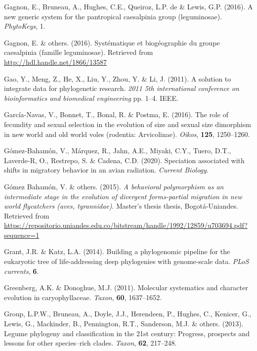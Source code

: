\documentclass[]{article}
\begin{document}
\leavevmode\hypertarget{ref-gagnon2016new}{}%
Gagnon, E., Bruneau, A., Hughes, C.E., Queiroz, L.P. de \& Lewis, G.P. (2016). A new generic system for the pantropical caesalpinia group (leguminosae). \emph{PhytoKeys}, 1.

\leavevmode\hypertarget{ref-gagnon2016systematique}{}%
Gagnon, E. \& others. (2016). Systématique et biogéographie du groupe caesalpinia (famille leguminosae). Retrieved from \url{http://hdl.handle.net/1866/13587}

\leavevmode\hypertarget{ref-gao2011solution}{}%
Gao, Y., Meng, Z., He, X., Liu, Y., Zhou, Y. \& Li, J. (2011). A solution to integrate data for phylogenetic research. \emph{2011 5th international conference on bioinformatics and biomedical engineering} pp. 1--4. IEEE.

\leavevmode\hypertarget{ref-garcia2016role}{}%
García-Navas, V., Bonnet, T., Bonal, R. \& Postma, E. (2016). The role of fecundity and sexual selection in the evolution of size and sexual size dimorphism in new world and old world voles (rodentia: Arvicolinae). \emph{Oikos}, \textbf{125}, 1250--1260.

\leavevmode\hypertarget{ref-gomez2020speciation}{}%
Gómez-Bahamón, V., Márquez, R., Jahn, A.E., Miyaki, C.Y., Tuero, D.T., Laverde-R, O., Restrepo, S. \& Cadena, C.D. (2020). Speciation associated with shifts in migratory behavior in an avian radiation. \emph{Current Biology}.

\leavevmode\hypertarget{ref-gomez2015behavioral}{}%
Gómez Bahamón, V. \& others. (2015). \emph{A behavioral polymorphism as an intermediate stage in the evolution of divergent forms-partial migration in new world flycatchers (aves, tyrannidae)}. Master's thesis thesis, Bogotá-Uniandes. Retrieved from \url{https://repositorio.uniandes.edu.co/bitstream/handle/1992/12859/u703694.pdf?sequence=1}

\leavevmode\hypertarget{ref-grant2014building}{}%
Grant, J.R. \& Katz, L.A. (2014). Building a phylogenomic pipeline for the eukaryotic tree of life-addressing deep phylogenies with genome-scale data. \emph{PLoS currents}, \textbf{6}.

\leavevmode\hypertarget{ref-greenberg2011caryophyllaceae}{}%
Greenberg, A.K. \& Donoghue, M.J. (2011). Molecular systematics and character evolution in caryophyllaceae. \emph{Taxon}, \textbf{60}, 1637--1652.

\leavevmode\hypertarget{ref-legume2013legume}{}%
Group, L.P.W., Bruneau, A., Doyle, J.J., Herendeen, P., Hughes, C., Kenicer, G., Lewis, G., Mackinder, B., Pennington, R.T., Sanderson, M.J. \& others. (2013). Legume phylogeny and classification in the 21st century: Progress, prospects and lessons for other species--rich clades. \emph{Taxon}, \textbf{62}, 217--248.
\end{document}
